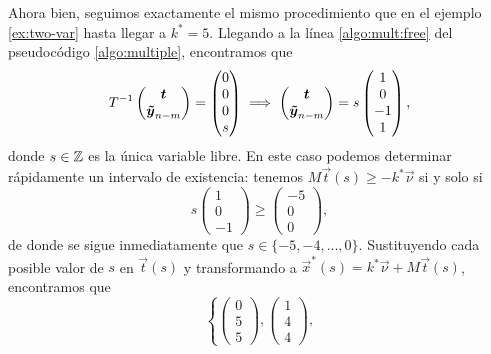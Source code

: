 \begin{example}
	Ahora bien, seguimos exactamente el mismo procedimiento que en el ejemplo \ref{ex:two-var} hasta
	llegar a $k^* = 5$. Llegando a la línea \ref{algo:mult:free} del pseudocódigo
	\ref{algo:multiple}, encontramos que
	\begin{equation*}
		T^{-1} \begin{pmatrix} \boldsymbol{t} \\ \boldsymbol{\tilde{y}}_{n-m} \end{pmatrix}
		=
		\begin{pmatrix} 0 \\ 0 \\ 0 \\ s \end{pmatrix}
		\implies
		\begin{pmatrix} \boldsymbol{t} \\ \boldsymbol{\tilde{y}}_{n-m} \end{pmatrix}
		=
		s \begin{pmatrix} 1 \\ 0 \\ -1 \\ 1 \end{pmatrix},
	\end{equation*}
	donde $s \in \mathbb{Z}$ es la única variable libre. En este caso podemos determinar rápidamente un
	intervalo de existencia: tenemos $M\vec{t}(s) \geq -k^*\vec{\nu}$ si y solo si
	\begin{equation*}
		s\begin{pmatrix} 1 \\ 0 \\ -1 \end{pmatrix} \geq
		\begin{pmatrix} -5 \\ 0 \\ 0 \end{pmatrix},
	\end{equation*}
	de donde se sigue inmediatamente que $s \in \lbrace -5, -4, \ldots, 0 \rbrace$. Sustituyendo
	cada posible valor de $s$ en $\vec{t}(s)$ y transformando a $\vec{x}^*(s) = k^*\vec{\nu} +
	M\vec{t}(s)$,
	encontramos que
	\begin{equation*}
		\left\lbrace
			\begin{pmatrix} 0 \\ 5 \\ 5 \end{pmatrix},
			\begin{pmatrix} 1 \\ 4 \\ 4 \end{pmatrix},

\end{equation*}
\end{example}
